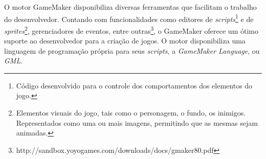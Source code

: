 O motor GameMaker disponibiliza diversas ferramentas que facilitam o trabalho
do desenvolvedor. Contando com funcionalidades como editores de
\textit{scripts}\footnote{Código desenvolvido para o controle dos
comportamentos dos elementos do jogo.} e de \textit{sprites}\footnote{Elementos
visuais do jogo, tais como o personagem, o fundo, os inimigos. Representados
como uma ou mais imagens, permitindo que as mesmas sejam animadas.},
gerenciadores de eventos, entre
outras\footnote{http://sandbox.yoyogames.com/downloads/docs/gmaker80.pdf}, o
GameMaker oferece um ótimo suporte ao desenvolvedor para a criação de jogos. O
motor disponibiliza uma linguagem de programação própria para seus
\textit{scripts}, a \textit{GameMaker Language}, ou \textit{GML}.
